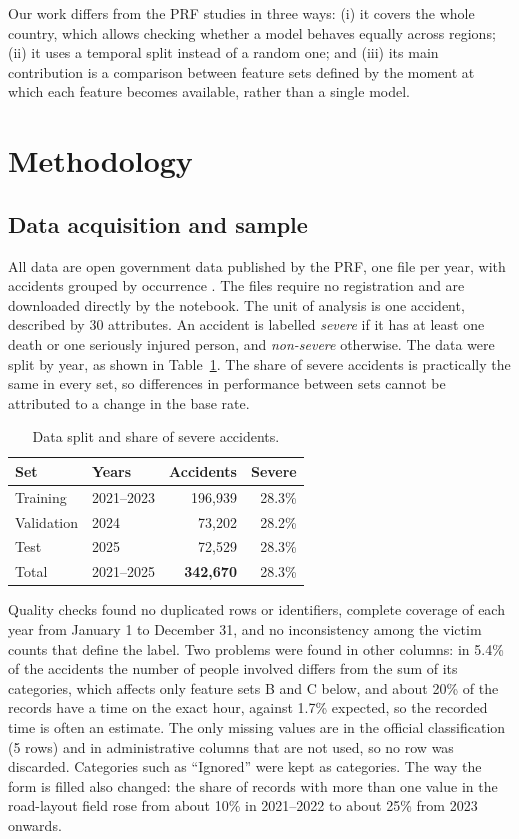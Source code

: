 \documentclass[12pt]{article}
\begin{document}
Our work differs from the PRF studies in three ways: (i) it covers the whole
country, which allows checking whether a model behaves equally across regions;
(ii) it uses a temporal split instead of a random one; and (iii) its main
contribution is a comparison between feature sets defined by the moment at
which each feature becomes available, rather than a single model.

\section{Methodology}

\subsection{Data acquisition and sample}

All data are open government data published by the PRF, one file per year,
with accidents grouped by occurrence \cite{prf2026}. The files require no registration and are downloaded
directly by the notebook. The unit of analysis is one accident, described by
30 attributes. An accident is labelled \emph{severe} if it has at least one
death or one seriously injured person, and \emph{non-severe} otherwise. The
data were split by year, as shown in Table~\ref{tab:sample}. The share of
severe accidents is practically the same in every set, so differences in
performance between sets cannot be attributed to a change in the base rate.

\begin{table}[ht]
\centering
\caption{Data split and share of severe accidents.}
\label{tab:sample}
\begin{tabular}{llrr}
\toprule
Set & Years & Accidents & Severe \\
\midrule
Training   & 2021--2023 & 196,939 & 28.3\% \\
Validation & 2024       &  73,202 & 28.2\% \\
Test       & 2025       &  72,529 & 28.3\% \\
\midrule
Total      & 2021--2025 & \textbf{342,670} & 28.3\% \\
\bottomrule
\end{tabular}
\end{table}

Quality checks found no duplicated rows or identifiers, complete coverage of
each year from January 1 to December 31, and no inconsistency among the victim
counts that define the label. Two problems were found in other columns: in
5.4\% of the accidents the number of people involved differs from the sum of
its categories, which affects only feature sets B and C below, and about 20\%
of the records have a time on the exact hour, against 1.7\% expected, so the
recorded time is often an estimate. The only missing values are in the official
classification (5 rows) and in administrative columns that are not used, so no
row was discarded. Categories such as ``Ignored'' were kept as categories. The
way the form is filled also changed: the share of records with more than one
value in the road-layout field rose from about 10\% in 2021--2022 to about 25\%
from 2023 onwards.
\end{document}
